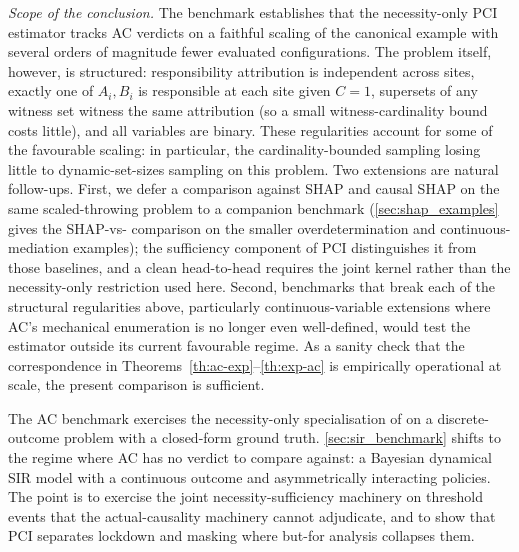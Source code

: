 \medskip\noindent\textit{Scope of the conclusion.}
The benchmark establishes that the necessity-only PCI estimator tracks AC verdicts
on a faithful scaling of the canonical example with several orders of magnitude
fewer evaluated configurations. The problem itself, however, is structured:
responsibility attribution is independent across sites, exactly one of $A_i,B_i$ is responsible at
each site given $C{=}1$, supersets of any witness set witness the same attribution
(so a small witness-cardinality bound costs little), and all variables are binary.
These regularities account for some of the favourable scaling: in particular,
the cardinality-bounded sampling losing little to dynamic-set-sizes sampling on
this problem. Two extensions are natural follow-ups. First, we defer a comparison
against SHAP and causal SHAP on the same scaled-throwing problem to a
companion benchmark (\cref{sec:shap_examples} gives the SHAP-vs-\ourapproach{}
comparison on the smaller overdetermination and continuous-mediation examples); the sufficiency component of PCI distinguishes it from those baselines, and a clean head-to-head
requires the joint kernel rather than the necessity-only restriction used here.
Second, benchmarks that break each of the structural regularities above,
particularly continuous-variable extensions where AC's mechanical enumeration is
no longer even well-defined, would test the estimator outside its current
favourable regime. As a sanity check that the correspondence in
Theorems~\ref{th:ac-exp}--\ref{th:exp-ac} is empirically operational at scale, the
present comparison is sufficient.

The AC benchmark exercises the necessity-only
specialisation of \ourapproach on a discrete-outcome problem with a closed-form
ground truth. \cref{sec:sir_benchmark} shifts to the regime where AC has no
verdict to compare against: a Bayesian dynamical SIR model with a continuous
outcome and asymmetrically interacting policies. The point is to exercise the joint
necessity-sufficiency machinery on threshold events that the actual-causality
machinery cannot adjudicate, and to show that PCI separates lockdown and masking
where but-for analysis collapses them.
